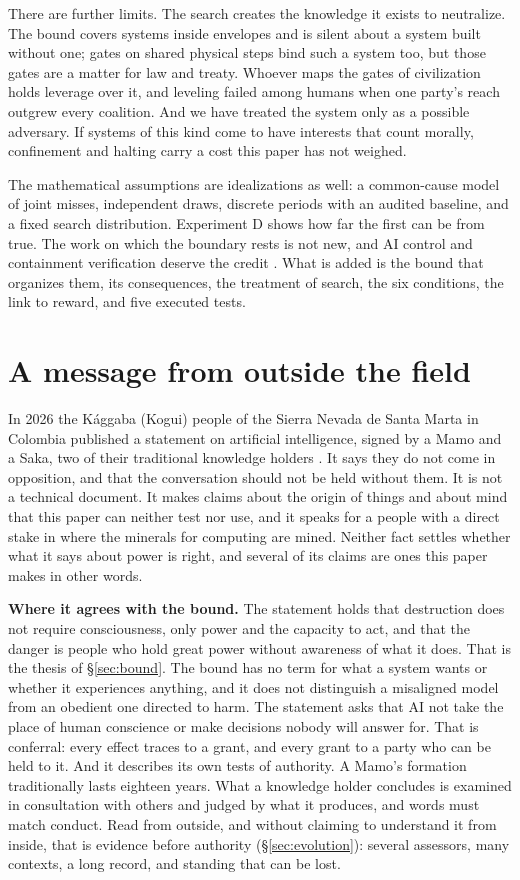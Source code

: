 \documentclass[10pt,twocolumn]{article}
\theoremstyle{plain}
\theoremstyle{definition}
\newcommand{\para}[1]{\smallskip\noindent\textbf{#1}\enspace}
\begin{document}
There are further limits. The search creates the knowledge it exists to neutralize. The bound
covers systems inside envelopes and is silent about a system built without one; gates on
shared physical steps bind such a system too, but those gates are a matter for law and
treaty. Whoever maps the gates of civilization holds leverage over it, and leveling failed
among humans when one party's reach outgrew every coalition. And we have treated the system
only as a possible adversary. If systems of this kind come to have interests that count
morally, confinement and halting carry a cost this paper has not weighed.

The mathematical assumptions are idealizations as well: a common-cause model of joint misses, independent draws, discrete periods with an audited baseline, and a fixed search distribution.
Experiment D shows how far the first can be from true. The work on which the boundary rests
is not new, and AI control and containment verification deserve the credit
\cite{greenblatt2024control,moon2026}. What is added is the bound
that organizes them, its consequences, the treatment of search, the six conditions, the link to reward, and five executed tests.

\section{A message from outside the field}\label{sec:kogui}

In 2026 the K\'aggaba (Kogui) people of the Sierra Nevada de Santa Marta in Colombia
published a statement on artificial intelligence, signed by a Mamo and a Saka, two of their
traditional knowledge holders \cite{kogui2026}. It says they do not come in opposition, and
that the conversation should not be held without them. It is not a technical document. It
makes claims about the origin of things and about mind that this paper can neither test nor
use, and it speaks for a people with a direct stake in where the minerals for computing are
mined. Neither fact settles whether what it says about power is right, and several of its
claims are ones this paper makes in other words.

\para{Where it agrees with the bound.} The statement holds that destruction does not require
consciousness, only power and the capacity to act, and that the danger is people who hold
great power without awareness of what it does. That is the thesis of \S\ref{sec:bound}. The
bound has no term for what a system wants or whether it experiences anything, and it does
not distinguish a misaligned model from an obedient one directed to harm. The statement asks
that AI not take the place of human conscience or make decisions nobody will answer for.
That is conferral: every effect traces to a grant, and every grant to a party who can be held
to it. And it describes its own tests of authority. A Mamo's formation traditionally lasts
eighteen years. What a knowledge holder concludes is examined in consultation with others
and judged by what it produces, and words must match conduct. Read from outside, and
without claiming to understand it from inside, that is evidence before authority
(\S\ref{sec:evolution}): several assessors, many contexts, a long record, and standing that
can be lost.
\end{document}
